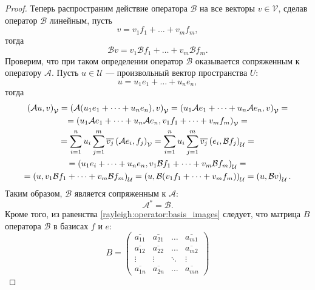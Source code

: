 \begin{proof}
    Теперь распространим действие оператора $\mathcal{B}$ на все векторы $v \in \mathcal{V}$, сделав оператор $\mathcal{B}$ линейным, пусть
    \[
        v = v_1 f_1 + \dots + v_m f_m,
    \]
    тогда
    \[
        \mathcal{B} v = v_1 \mathcal{B} f_1 + \dots + v_m \mathcal{B} f_m .
    \]
    Проверим, что при таком определении оператор $\mathcal{B}$ оказывается сопряженным к оператору $\mathcal{A}$. Пусть $u \in \mathcal{U}$ --- произвольный вектор
    пространства $U$:
    \[
        u = u_1 e_1 + \dots + u_n e_n,
    \]
    тогда
    \begin{multline*}
        \left ( \mathcal{A} u, v \right )_\mathcal{V}
        = \left ( \mathcal{A} (u_1 e_1 + \dots + u_n e_n), v \right )_\mathcal{V}
        = \left ( u_1 \mathcal{A} e_1 + \dots + u_n \mathcal{A} e_n, v \right )_\mathcal{V} = \\
        = \left ( u_1 \mathcal{A} e_1 + \dots + u_n \mathcal{A} e_n, v_1 f_1 + \dots + v_m f_m \right )_\mathcal{V} = \\
        = \sum_{i=1}^n u_i \sum_{j=1}^m \overline{v_j} \left ( \mathcal{A} e_i, f_j \right )_\mathcal{V}
        = \sum_{i=1}^n u_i \sum_{j=1}^m \overline{v_j} \left ( e_i, \mathcal{B} f_j \right )_\mathcal{U} = \\
        = \left ( u_1 e_i + \dots + u_n e_n, v_1 \mathcal{B} f_1 + \dots + v_m \mathcal{B} f_m \right )_\mathcal{U} = \\
        = \left ( u, v_1 \mathcal{B} f_1 + \dots + v_m \mathcal{B} f_m \right )_\mathcal{U}
        = \left ( u, \mathcal{B} (v_1 f_1 + \dots + v_m f_m) \right )_\mathcal{U}
        = \left ( u, \mathcal{B} v \right )_\mathcal{U} .
    \end{multline*}
    Таким образом, $\mathcal{B}$ является сопряженным к $\mathcal{A}$:
    \[
        \mathcal{A}^* = \mathcal{B}.
    \]
    Кроме того, из равенства \eqref{rayleigh:operator:basis_images} следует, что матрица $B$ оператора $\mathcal{B}$ в базисах $f$ и $e$:
    \[
        B =
        \begin{pmatrix}
            \overline{a_{11}} & \overline{a_{21}} & \dots  & \overline{a_{m1}} \\
            \overline{a_{12}} & \overline{a_{22}} & \dots  & \overline{a_{m2}} \\
            \vdots            & \vdots            & \ddots & \vdots            \\
            \overline{a_{1n}} & \overline{a_{2n}} & \dots  & \overline{a_{mn}}
        \end{pmatrix}
\]
\end{proof}
